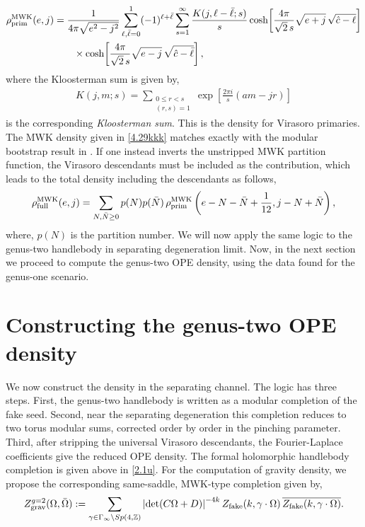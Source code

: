 \documentclass[12 pt]{article}
\begin{document}
\begin{align}
\begin{split}
    \rho^{\rm MWK}_{\rm prim}(e,j)
    &=
    \frac{1}{4\pi\sqrt{e^2-j^2}}
    \sum_{\ell,\bar\ell=0}^{1}
    (-1)^{\ell+\bar\ell}
    \sum_{s=1}^{\infty}
    \frac{K(j,\ell-\bar\ell;s)}{s}
    \cosh\!\left[
        \frac{4\pi}{\sqrt{2}\,s}
        \sqrt{e+j}
        \,\sqrt{\hat c-\ell}
    \right]
    \\
    &\qquad \times
    \cosh\!\left[
        \frac{4\pi}{\sqrt{2}\,s}
        \sqrt{e-j}
        \,\sqrt{\hat c-\bar\ell}
    \right],\label{4.29kkk}
\end{split}
\end{align}
where the Kloosterman sum is given by,
\begin{align}
    K(j,m;s)
    = \sum_{\substack{0\le r<s\\(r,s)=1}}
    \exp\!\left[
        \frac{2\pi i}{s}(am-jr)
    \right]
\end{align}
is the corresponding \textit{Kloosterman sum}.  This is the density for Virasoro primaries. The MWK density given in \eqref{4.29kkk} matches exactly with the modular bootstrap result in \cite{Benjamin:2019stq}.  If one instead inverts the unstripped MWK partition function, the Virasoro descendants must be included as the contribution, which leads to the total density including the descendants as follows,
\begin{align}
    \rho^{\rm MWK}_{\rm full}(e,j)
    =
    \sum_{N,\bar N\ge0}p(N)p(\bar N)\,
    \rho^{\rm MWK}_{\rm prim}
    \left(e-N-\bar N+\frac{1}{12},j-N+\bar N\right),
    \label{eq:mwk-full-desc-convolution}
\end{align}
where, $p(N)$ is the partition number. We will now apply the same logic to the genus-two handlebody in separating degeneration limit. Now, in the next section we proceed to compute the genus-two OPE density, using the data found for the genus-one scenario.

\section{Constructing the genus-two OPE density}\label{secc5}

We now construct the density in the separating channel. The logic has three steps.  First, the genus-two handlebody is written as a modular completion of the fake seed.  Second, near the separating degeneration this completion reduces to two torus modular sums, corrected order by order in the pinching parameter.  Third, after stripping the universal Virasoro descendants, the Fourier-Laplace coefficients give the reduced OPE density.
The formal holomorphic handlebody completion is given above in \eqref{2.1u}.
For the computation of gravity density, we propose the corresponding same-saddle, MWK-type completion given by,
\begin{align}
    Z_{\rm grav}^{g=2}(\Omega,\bar\Omega)
:=\sum_{\gamma\in\Gamma_\infty\backslash Sp(4,\mathbb Z)}
    \left|\det(C\Omega+D)\right|^{-4k}
    Z_{\rm fake}(k,\gamma\cdot\Omega)\,
    \overline{Z_{\rm fake}(k,\gamma\cdot\Omega)}.
    \label{eq:same-saddle-gravity}
\end{align}
\end{document}
